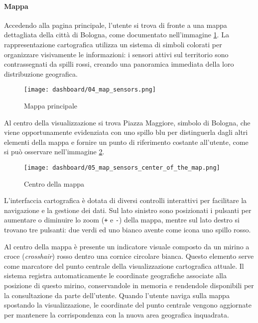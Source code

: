\paragraph{Mappa}

Accedendo alla pagina principale, l'utente si trova di fronte a una mappa dettagliata della città di Bologna,
come documentato nell'immagine \ref{fig:app-map-sensors}. La rappresentazione cartografica utilizza un sistema
di simboli colorati per organizzare visivamente le informazioni: i sensori attivi sul territorio
sono contrassegnati da spilli rossi, creando una panoramica immediata della loro distribuzione geografica.

\begin{figure}[H]
  \centering
  \texttt{[image: dashboard/04\_map\_sensors.png]}
  \caption{Mappa principale}
  \label{fig:app-map-sensors}
\end{figure}

Al centro della visualizzazione si trova Piazza Maggiore, simbolo di Bologna, che viene opportunamente evidenziata
con uno spillo blu per distinguerla dagli altri elementi della mappa e fornire un punto di riferimento
costante all'utente, come si può osservare nell'immagine \ref{fig:app-map-center}.

\begin{figure}[H]
  \centering
  \texttt{[image: dashboard/05\_map\_sensors\_center\_of\_the\_map.png]}
  \caption{Centro della mappa}
  \label{fig:app-map-center}
\end{figure}

L'interfaccia cartografica è dotata di diversi controlli interattivi per facilitare la navigazione e la
gestione dei dati.
Sul lato sinistro sono posizionati i pulsanti per aumentare o diminuire lo zoom (\texttt{+} e \texttt{-}) della mappa,
mentre sul lato destro si trovano tre pulsanti: due verdi ed uno bianco avente come icona uno spillo rosso.

Al centro della mappa è presente un indicatore visuale composto da un mirino a croce (\textit{crosshair}) rosso
dentro una cornice circolare bianca. Questo elemento serve come marcatore del punto centrale della
visualizzazione cartografica attuale. Il sistema registra automaticamente le coordinate geografiche associate
alla posizione di questo mirino, conservandole in memoria e rendendole disponibili per la consultazione
da parte dell'utente. Quando l'utente naviga sulla mappa spostando la visualizzazione, le coordinate
del punto centrale vengono aggiornate per mantenere la corrispondenza con la nuova area geografica inquadrata.

